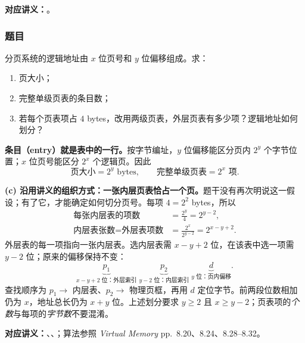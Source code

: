 
\textbf{对应讲义：}。

\subsubsection*{题目}

分页系统的逻辑地址由 $x$ 位页号和 $y$ 位偏移组成。求：
\begin{enumerate}[label=(\alph*)]
  \item 页大小；
  \item 完整单级页表的条目数；
  \item 若每个页表项占 $4$ bytes，改用两级页表，外层页表有多少项？逻辑地址如何划分？
\end{enumerate}

\begin{checkedsolution}
\textbf{条目（entry）就是表中的一行。}按字节编址，$y$ 位偏移能区分页内 $2^y$ 个字节位置；$x$ 位页号能区分 $2^x$ 个逻辑页。因此
\[
  \boxed{\text{页大小}=2^y\text{ bytes}},\qquad
  \boxed{\text{完整单级页表}=2^x\text{ 项}}.
\]

\textbf{(c) 沿用讲义的组织方式：一张内层页表恰占一个页。}题干没有再次明说这一假设；有了它，才能确定如何切分页号。每项 $4=2^2$ bytes，所以
\[
\begin{aligned}
  \text{每张内层表的项数}
    &=\frac{2^y}{4}=\boxed{2^{y-2}},\\
  \text{内层表张数}=\text{外层表项数}
    &=\frac{2^x}{2^{y-2}}=\boxed{2^{x-y+2}}.
\end{aligned}
\]
外层表的每一项指向一张内层表。选内层表需 $x-y+2$ 位，在该表中选一项需 $y-2$ 位；原来的偏移保持不变：
\[
  \boxed{\underbrace{p_1}_{x-y+2\text{ 位：外层索引}}}
  \;\boxed{\underbrace{p_2}_{y-2\text{ 位：内层索引}}}
  \;\boxed{\underbrace{d}_{y\text{ 位：页内偏移}}}.
\]
查找顺序为 $p_1\to$ 内层表、$p_2\to$ 物理页框，再用 $d$ 定位字节。前两段位数相加仍为 $x$，地址总长仍为 $x+y$ 位。上述划分要求 $y\ge2$ 且 $x\ge y-2$；页表项的\emph{个数}与每项的\emph{字节数}不要混淆。
\end{checkedsolution}


\textbf{对应讲义：}、、；算法参照 \emph{Virtual Memory} pp.~8.20、8.24、8.28--8.32。

